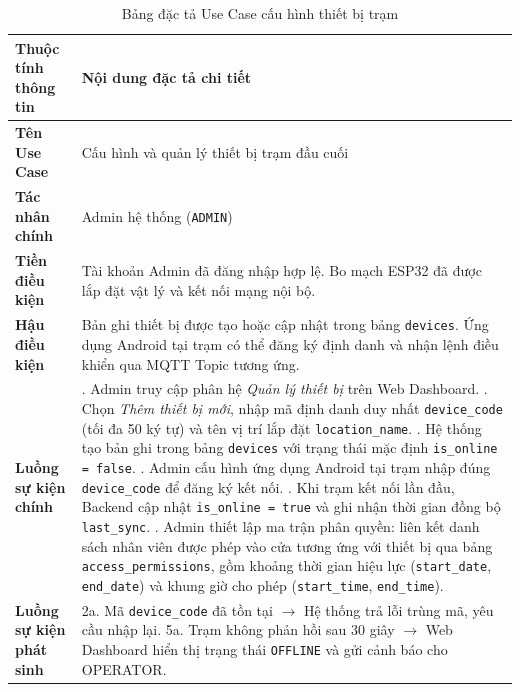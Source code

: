 \documentclass[../DoAn.tex]{subfiles}
\begin{document}
\begin{table}[ht!]
\centering
\small
\renewcommand{\arraystretch}{1.3}
\caption{Bảng đặc tả Use Case cấu hình thiết bị trạm}
\label{tab:uc_device_config}
\begin{tabular}{|>{\raggedright\arraybackslash}p{3.5cm}|>{\raggedright\arraybackslash}p{10.1cm}|}
\hline
\textbf{Thuộc tính thông tin} & \textbf{Nội dung đặc tả chi tiết} \\ \hline
\textbf{Tên Use Case} & Cấu hình và quản lý thiết bị trạm đầu cuối \\ \hline
\textbf{Tác nhân chính} & Admin hệ thống (\texttt{ADMIN}) \\ \hline
\textbf{Tiền điều kiện} & Tài khoản Admin đã đăng nhập hợp lệ. Bo mạch ESP32 đã được lắp đặt vật lý và kết nối mạng nội bộ. \\ \hline
\textbf{Hậu điều kiện} & Bản ghi thiết bị được tạo hoặc cập nhật trong bảng \texttt{devices}. Ứng dụng Android tại trạm có thể đăng ký định danh và nhận lệnh điều khiển qua MQTT Topic tương ứng. \\ \hline
\textbf{Luồng sự kiện chính} &
1. Admin truy cập phân hệ \textit{Quản lý thiết bị} trên Web Dashboard. \newline
2. Chọn \textit{Thêm thiết bị mới}, nhập mã định danh duy nhất \texttt{device\_code} (tối đa 50 ký tự) và tên vị trí lắp đặt \texttt{location\_name}. \newline
3. Hệ thống tạo bản ghi trong bảng \texttt{devices} với trạng thái mặc định \texttt{is\_online = false}. \newline
4. Admin cấu hình ứng dụng Android tại trạm nhập đúng \texttt{device\_code} để đăng ký kết nối. \newline
5. Khi trạm kết nối lần đầu, Backend cập nhật \texttt{is\_online = true} và ghi nhận thời gian đồng bộ \texttt{last\_sync}. \newline
6. Admin thiết lập ma trận phân quyền: liên kết danh sách nhân viên được phép vào cửa tương ứng với thiết bị qua bảng \texttt{access\_permissions}, gồm khoảng thời gian hiệu lực (\texttt{start\_date}, \texttt{end\_date}) và khung giờ cho phép (\texttt{start\_time}, \texttt{end\_time}). \\ \hline
\textbf{Luồng sự kiện phát sinh} &
2a. Mã \texttt{device\_code} đã tồn tại $\rightarrow$ Hệ thống trả lỗi trùng mã, yêu cầu nhập lại. \newline
5a. Trạm không phản hồi sau 30 giây $\rightarrow$ Web Dashboard hiển thị trạng thái \texttt{OFFLINE} và gửi cảnh báo cho OPERATOR. \\ \hline
\end{tabular}
\end{table}
\end{document}
